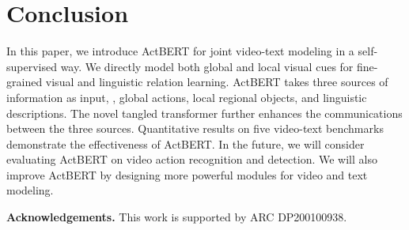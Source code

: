 \documentclass[10pt,twocolumn,letterpaper]{article}
\newcommand{\ours}{ActBERT\xspace}
\begin{document}
\section{Conclusion}
In this paper, we introduce \ours for joint video-text modeling in a self-supervised way. We directly model both global and local visual cues for fine-grained visual and linguistic relation learning. \ours takes three sources of information as input, \ie, global actions, local regional objects, and linguistic descriptions. The novel tangled transformer further enhances the communications between the three sources.
Quantitative results on five video-text benchmarks demonstrate the effectiveness of \ours. In the future, we will consider evaluating \ours on video action recognition and detection. We will also improve \ours by designing more powerful modules for video and text modeling.

\noindent\textbf{Acknowledgements.} This work is supported by ARC DP200100938.

{\small


}
\end{document}
